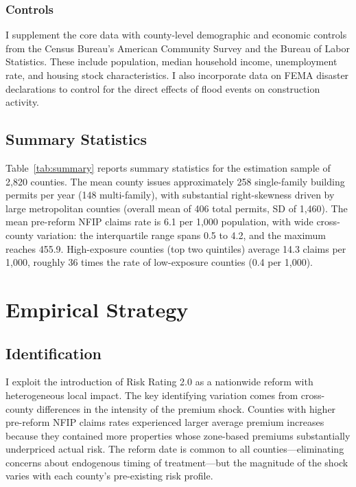 \documentclass[12pt]{article}
\begin{document}
\subsubsection*{Controls} I supplement the core data with county-level demographic and economic controls from the Census Bureau's American Community Survey and the Bureau of Labor Statistics. These include population, median household income, unemployment rate, and housing stock characteristics. I also incorporate data on FEMA disaster declarations to control for the direct effects of flood events on construction activity.

\subsection{Summary Statistics}



Table~\ref{tab:summary} reports summary statistics for the estimation sample of 2,820 counties. The mean county issues approximately 258 single-family building permits per year (148 multi-family), with substantial right-skewness driven by large metropolitan counties (overall mean of 406 total permits, SD of 1,460). The mean pre-reform NFIP claims rate is 6.1 per 1,000 population, with wide cross-county variation: the interquartile range spans 0.5 to 4.2, and the maximum reaches 455.9. High-exposure counties (top two quintiles) average 14.3 claims per 1,000, roughly 36 times the rate of low-exposure counties (0.4 per 1,000).


\section{Empirical Strategy}
\label{sec:strategy}

\subsection{Identification}

I exploit the introduction of Risk Rating 2.0 as a nationwide reform with heterogeneous local impact. The key identifying variation comes from cross-county differences in the intensity of the premium shock. Counties with higher pre-reform NFIP claims rates experienced larger average premium increases because they contained more properties whose zone-based premiums substantially underpriced actual risk. The reform date is common to all counties---eliminating concerns about endogenous timing of treatment---but the magnitude of the shock varies with each county's pre-existing risk profile.
\end{document}
